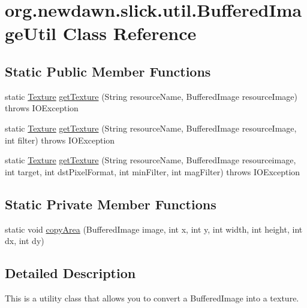 \hypertarget{classorg_1_1newdawn_1_1slick_1_1util_1_1_buffered_image_util}{}\section{org.\+newdawn.\+slick.\+util.\+Buffered\+Image\+Util Class Reference}
\label{classorg_1_1newdawn_1_1slick_1_1util_1_1_buffered_image_util}
\subsection*{Static Public Member Functions}
\begin{DoxyCompactItemize}
\item 
static \mbox{\hyperlink{interfaceorg_1_1newdawn_1_1slick_1_1opengl_1_1_texture}{Texture}} \mbox{\hyperlink{classorg_1_1newdawn_1_1slick_1_1util_1_1_buffered_image_util_a60639f0e446fa211b987096681b98615}{get\+Texture}} (String resource\+Name, Buffered\+Image resource\+Image)  throws I\+O\+Exception 
\item 
static \mbox{\hyperlink{interfaceorg_1_1newdawn_1_1slick_1_1opengl_1_1_texture}{Texture}} \mbox{\hyperlink{classorg_1_1newdawn_1_1slick_1_1util_1_1_buffered_image_util_aab5af0fd218410addd8f7feff0bbf8f4}{get\+Texture}} (String resource\+Name, Buffered\+Image resource\+Image, int filter)  throws I\+O\+Exception 
\item 
static \mbox{\hyperlink{interfaceorg_1_1newdawn_1_1slick_1_1opengl_1_1_texture}{Texture}} \mbox{\hyperlink{classorg_1_1newdawn_1_1slick_1_1util_1_1_buffered_image_util_adeb7dc3f0a04a157bceb0a2e1aeaf57a}{get\+Texture}} (String resource\+Name, Buffered\+Image resourceimage, int target, int dst\+Pixel\+Format, int min\+Filter, int mag\+Filter)  throws I\+O\+Exception 
\end{DoxyCompactItemize}
\subsection*{Static Private Member Functions}
\begin{DoxyCompactItemize}
\item 
static void \mbox{\hyperlink{classorg_1_1newdawn_1_1slick_1_1util_1_1_buffered_image_util_a6975c7af5e9f4f590aa952966b4f2510}{copy\+Area}} (Buffered\+Image image, int x, int y, int width, int height, int dx, int dy)
\end{DoxyCompactItemize}


\subsection{Detailed Description}
This is a utility class that allows you to convert a Buffered\+Image into a texture.

